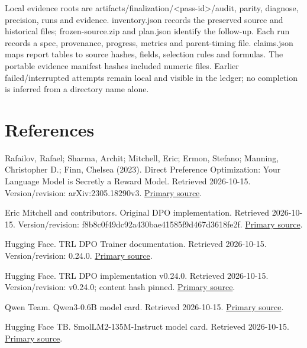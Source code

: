 \documentclass[10pt]{article}
\begin{document}
Local evidence roots are artifacts/finalization/<pass-id>/audit, parity, diagnose, precision, runs and evidence. inventory.json records the preserved source and historical files; frozen-source.zip and plan.json identify the follow-up. Each run records a spec, provenance, progress, metrics and parent-timing file. claims.json maps report tables to source hashes, fields, selection rules and formulas. The portable evidence manifest hashes included numeric files. Earlier failed/interrupted attempts remain local and visible in the ledger; no completion is inferred from a directory name alone.


\section*{References}

\noindent [R1] Rafailov, Rafael; Sharma, Archit; Mitchell, Eric; Ermon, Stefano; Manning, Christopher D.; Finn, Chelsea (2023). Direct Preference Optimization: Your Language Model is Secretly a Reward Model. Retrieved 2026-10-15. Version/revision: arXiv:2305.18290v3. \href{https://arxiv.org/abs/2305.18290}{Primary source}.\par

\noindent [R2] Eric Mitchell and contributors. Original DPO implementation. Retrieved 2026-10-15. Version/revision: f8b8c0f49dc92a430bae41585f9d467d3618fe2f. \href{https://github.com/eric-mitchell/direct-preference-optimization/tree/f8b8c0f49dc92a430bae41585f9d467d3618fe2f}{Primary source}.\par

\noindent [R3] Hugging Face. TRL DPO Trainer documentation. Retrieved 2026-10-15. Version/revision: 0.24.0. \href{https://huggingface.co/docs/trl/v0.24.0/en/dpo_trainer}{Primary source}.\par

\noindent [R4] Hugging Face. TRL DPO implementation v0.24.0. Retrieved 2026-10-15. Version/revision: v0.24.0; content hash pinned. \href{https://raw.githubusercontent.com/huggingface/trl/v0.24.0/trl/trainer/dpo_trainer.py}{Primary source}.\par

\noindent [R5] Qwen Team. Qwen3-0.6B model card. Retrieved 2026-10-15. \href{https://huggingface.co/Qwen/Qwen3-0.6B/raw/main/README.md}{Primary source}.\par

\noindent [R6] Hugging Face TB. SmolLM2-135M-Instruct model card. Retrieved 2026-10-15. \href{https://huggingface.co/HuggingFaceTB/SmolLM2-135M-Instruct/raw/main/README.md}{Primary source}.\par
\end{document}
